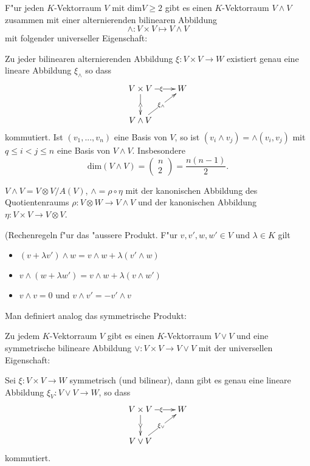 \documentclass[9pt, a4paper, twocolumn, landscape]{article}
\begin{document}
{\begin{theorem}
F"ur jeden $K$-Vektorraum $V$ mit $\mathrm{dim} V \geq 2$ gibt es einen $K$-Vektorraum $V \wedge V$ zusammen mit einer alternierenden bilinearen Abbildung 
$$\wedge: V \times V \mapsto V \wedge V$$ mit folgender universeller Eigenschaft:

Zu jeder bilinearen alternierenden Abbildung $\xi: V \times V \rightarrow W$ existiert genau eine lineare Abbildung $\xi_\wedge$ so dass
\begin{gather*}
  \xymatrix{V \times V  \ar[d]|{\wedge} \ar[r]|{\xi} & W\\
    V \wedge V \ar[ur]|{\xi_\wedge} & }
\end{gather*}
kommutiert.
Ist $(v_1, ..., v_n)$ eine Basis von $V$, so ist $(v_i \wedge v_j) = \wedge(v_i, v_j)$ mit $q \leq i < j \leq n$ eine Basis von $V \wedge V$. Insbesondere 
$$
\mathrm{dim}(V \wedge V) = \left(\begin{array}{c} n\\ 2 
\end{array} \right) = \frac{n(n-1)}{2}.
$$
\end{theorem}
$V \wedge V = V \otimes V / A(V)$, $\wedge = \rho \circ \eta$ mit der kanonischen Abbildung des Quotientenraums $\rho: V \otimes W \rightarrow V \wedge V$ und der kanonischen Abbildung $\eta: V \times V \rightarrow V \otimes V$.


\begin{remark}(Rechenregeln f"ur das "aussere Produkt.
F"ur $v, v', w, w' \in V$ und $\lambda \in K$ gilt
\begin{itemize}
\item $(v + \lambda v') \wedge w = v  \wedge w + \lambda(v'  \wedge w )$
\item $v  \wedge (w + \lambda w') = v  \wedge w + \lambda(v  \wedge w ')$
\item $v \wedge v = 0$ und $ v \wedge v' = - v' \wedge v$
\end{itemize}
\end{remark}

\begin{theorem}
Man definiert analog das symmetrische Produkt:

Zu jedem $K$-Vektorraum $V$ gibt es einen $K$-Vektorraum $V \vee V$ und eine symmetrische bilineare Abbildung $\vee: V \times V \rightarrow V \vee V$ mit der universellen Eigenschaft:

Sei $\xi : V \times V \rightarrow W$ symmetrisch (und bilinear), dann gibt es genau eine lineare Abbildung $\xi_V: V \vee V \rightarrow W$, so dass
\begin{gather*}
  \xymatrix{V \times V  \ar[d]|{\vee} \ar[r]|{\xi} & W\\
    V \vee V \ar[ur]|{\xi_\vee} & }
\end{gather*}
kommutiert.


\end{theorem}}
\end{document}

